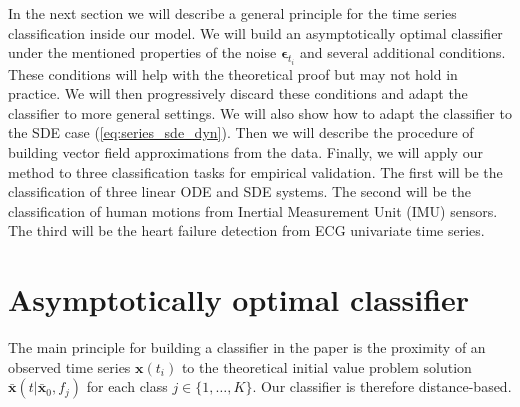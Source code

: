 \documentclass[referee, pdflatex, sn-mathphys-num]{sn-jnl}
\theoremstyle{definition}
\theoremstyle{plain}
\newcommand{\bx}{\ensuremath{\mathbf{x}}}
\newcommand{\bbx}{\ensuremath{\bar{\mathbf{x}}}}
\newcommand{\beps}{\ensuremath{\boldsymbol{\epsilon}}}
\begin{document}
	In the next section we will describe a general principle for the time series classification inside our model. We will build an asymptotically optimal classifier under the mentioned properties of the noise $\beps_{t_i}$ and several additional conditions. These conditions will help with the theoretical proof but may not hold in practice. We will then progressively discard these conditions and adapt the classifier to more general settings. We will also show how to adapt the classifier to the SDE case (\ref{eq:series_sde_dyn}). Then we will describe the procedure of building vector field approximations from the data. Finally, we will apply our method to three classification tasks for empirical validation. The first will be the classification of three linear ODE and SDE systems. The second will be the classification of human motions from Inertial Measurement Unit (IMU) sensors. The third will be the heart failure detection from ECG univariate time series.
	
	\section{Asymptotically optimal classifier}\label{sec:asympt_cls}
	
	The main principle for building a classifier in the paper is the proximity of an observed time series $\bx(t_i)$ to the theoretical initial value problem solution $\bbx(t | \bbx_0, f_j)$ for each class $j \in \{1, \ldots, K\}$. Our classifier is therefore distance-based.
	
\end{document}
